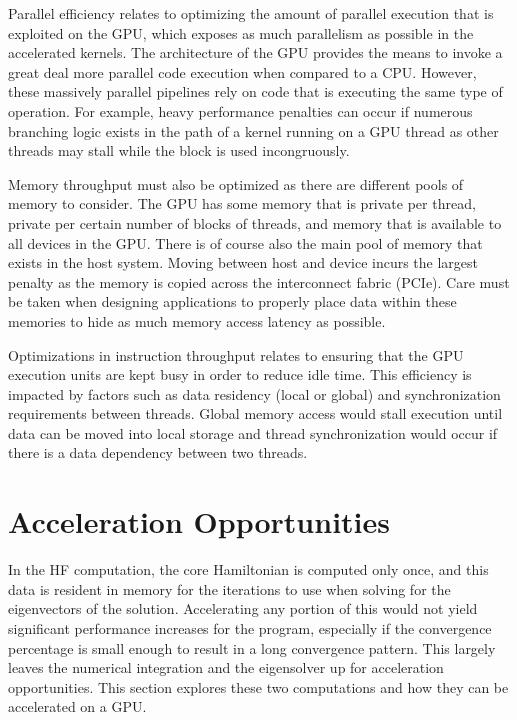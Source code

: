 \documentclass[conference, twoside]{IEEEtran}
\begin{document}
Parallel efficiency relates to optimizing the amount of parallel execution that is exploited on the GPU, which exposes as much parallelism as possible in the accelerated kernels. The architecture of the GPU provides the means to invoke a great deal more parallel code execution when compared to a CPU. However, these massively parallel pipelines rely on code that is executing the same type of operation. For example, heavy performance penalties can occur if numerous branching logic exists in the path of a kernel running on a GPU thread as other threads may stall while the block is used incongruously.

Memory throughput must also be optimized as there are different pools of memory to consider. The GPU has some memory that is private per thread, private per certain number of blocks of threads, and memory that is available to all devices in the GPU. There is of course also the main pool of memory that exists in the host system. Moving between host and device incurs the largest penalty as the memory is copied across the interconnect fabric (PCIe). Care must be taken when designing applications to properly place data within these memories to hide as much memory access latency as possible.

Optimizations in instruction throughput relates to ensuring that the GPU execution units are kept busy in order to reduce idle time. This efficiency is impacted by factors such as data residency (local or global) and synchronization requirements between threads. Global memory access would stall execution until data can be moved into local storage and thread synchronization would occur if there is a data dependency between two threads.

\section{Acceleration Opportunities}

In the HF computation, the core Hamiltonian is computed only once, and this data is resident in memory for the iterations to use when solving for the eigenvectors of the solution. Accelerating any portion of this would not yield significant performance increases for the program, especially if the convergence percentage is small enough to result in a long convergence pattern. This largely leaves the numerical integration and the eigensolver up for acceleration opportunities. This section explores these two computations and how they can be accelerated on a GPU.
\end{document}
